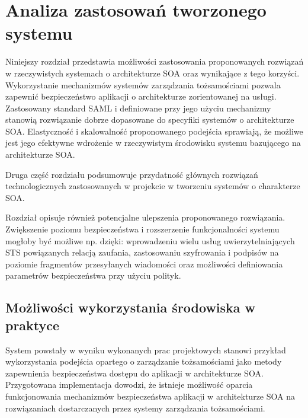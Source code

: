 \chapter{Analiza zastosowań tworzonego systemu}
\label{cha:zastosowania}

{\it

Niniejszy rozdział przedstawia możliwości zastosowania proponowanych rozwiązań w rzeczywistych systemach o architekturze SOA oraz wynikające z tego korzyści. Wykorzystanie mechanizmów systemów zarządzania tożsamościami pozwala zapewnić bezpieczeństwo aplikacji o architekturze zorientowanej na usługi. Zastosowany standard SAML i definiowane przy jego użyciu mechanizmy stanowią rozwiązanie dobrze dopasowane do specyfiki systemów o architekturze SOA. Elastyczność i skalowalność proponowanego podejścia sprawiają, że możliwe jest jego efektywne wdrożenie w rzeczywistym środowisku systemu bazującego na architekturze SOA.

Druga część rozdziału podsumowuje przydatność głównych rozwiązań technologicznych zastosowanych w projekcie w tworzeniu systemów o charakterze SOA.

Rozdział opisuje również potencjalne ulepszenia proponowanego rozwiązania. Zwiększenie poziomu bezpieczeństwa i rozszerzenie funkcjonalności systemu mogłoby być możliwe np. dzięki: wprowadzeniu wielu usług uwierzytelniających STS powiązanych relacją zaufania, zastosowaniu szyfrowania i podpisów na poziomie fragmentów przesyłanych wiadomości oraz możliwości definiowania parametrów bezpieczeństwa przy użyciu polityk.

}


\section{Możliwości wykorzystania środowiska w praktyce}
\label{sec:wykorzystanieWPraktyce}

	System powstały w wyniku wykonanych prac projektowych stanowi przykład wykorzystania podejścia opartego o zarządzanie tożsamościami jako metody zapewnienia bezpieczeństwa dostępu do aplikacji w architekturze SOA. Przygotowana implementacja dowodzi, że  istnieje możliwość oparcia funkcjonowania mechanizmów bezpieczeństwa aplikacji w architekturze SOA na rozwiązaniach dostarczanych przez systemy zarządzania tożsamościami. 

